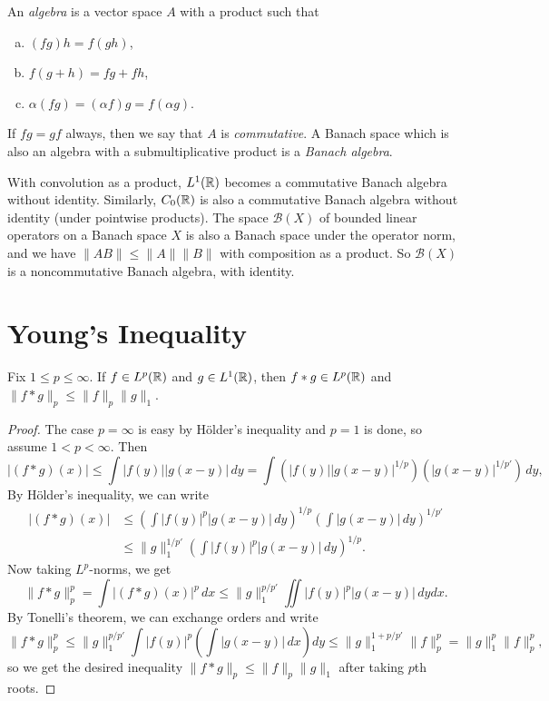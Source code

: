 \begin{definition}
  An \emph{algebra} is a vector space
  $A$ with a product such that
  \begin{enumerate}[(a)]
    \item $(fg) h = f(gh)$,
    \item $f(g + h) = fg + fh$,
    \item $\alpha (fg) = (\alpha f) g = f(\alpha g)$.
  \end{enumerate}
  If $fg = gf$ always, then we say that
  $A$ is \emph{commutative}.
  A Banach space which is also an algebra
  with a submultiplicative product
  is a \emph{Banach algebra}.
\end{definition}

\begin{example}
  With convolution as a product,
  $L^1(\mathbb{R})$ becomes a commutative
  Banach algebra without identity.
  Similarly, $C_0(\mathbb{R})$ is also a
  commutative Banach algebra
  without identity (under pointwise products).
  The space $\mathcal{B}(X)$ of
  bounded linear operators on a Banach
  space $X$ is also a Banach space under the
  operator norm, and
  we have $\|AB\| \le \|A\| \|B\|$
  with composition as a product.
  So $\mathcal{B}(X)$ is a noncommutative
  Banach algebra, with identity.
\end{example}

\section{Young's Inequality}
\begin{theorem}
  Fix $1 \le p \le \infty$. If
  $f \in L^p(\mathbb{R})$ and $g \in L^1(\mathbb{R})$, 
  then $f * g \in L^p(\mathbb{R})$ and
  $\|f * g\|_p \le \|f\|_p \|g\|_1$.
\end{theorem}

\begin{proof}
  The case $p = \infty$ is easy
  by H\"older's inequality and
  $p = 1$ is done,
  so assume $1 < p < \infty$. Then
  \[
    |(f * g)(x)|
    \le \int |f(y)| |g(x - y)|\, dy
    = \int \left(|f(y)| |g(x - y)|^{1 / p}\right) \left(|g(x - y)|^{1 / p'}\right) \, dy,
  \]
  By H\"older's inequality, we can write
  \begin{align*}
    |(f * g)(x)|
    &\le \left(\int |f(y)|^p |g(x - y)|\, dy\right)^{1 / p}
    \left(\int |g(x - y)|\, dy\right)^{1 / p'} \\
    &\le \|g\|_1^{1 / p'} \left(\int |f(y)|^p |g(x - y)|\, dy\right)^{1 / p}.
  \end{align*}
  Now taking $L^p$-norms, we get
  \[
    \|f * g\|_p^p
    = \int |(f * g)(x)|^p\, dx
    \le \|g\|_1^{p / p'}
    \iint |f(y)|^p |g(x - y)|\, dy dx.
  \]
  By Tonelli's theorem, we can exchange
  orders and write
  \[
    \|f * g\|_p^p
    \le \|g\|_1^{p / p'}
    \int |f(y)|^p \left(\int |g(x - y)|\, dx\right) dy
    \le \|g\|_1^{1 + p / p'} \|f\|_p^p
    = \|g\|_1^p \|f\|_p^p,
  \]
  so we get the desired inequality
  $\|f * g\|_p \le \|f\|_p \|g\|_1$
  after taking $p$th roots.
\end{proof}

